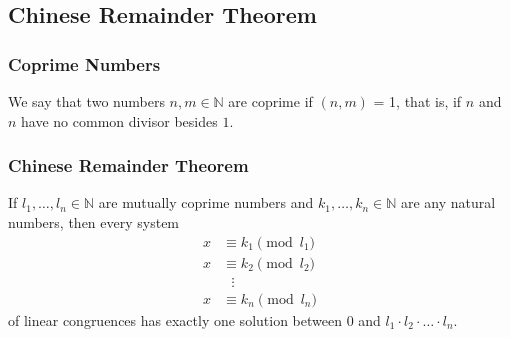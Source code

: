 \documentclass[aspectratio=169,11pt,usenames,dvipsnames]{beamer}
\newcommand{\N}{\mathbb{N}}
\begin{document}
\subsection{Chinese Remainder Theorem}

\begin{frame}
 \subsectionpage
\end{frame}

\begin{frame}
 \frametitle{Coprime Numbers}
 \begin{tcolorbox}[title=Coprime Numbers]
  We say that two numbers $n,m \in \N$ are \alert{coprime} if $(n,m)$ = 1, that
  is, if $n$ and $n$ have no common divisor besides $1$.
 \end{tcolorbox}
\end{frame}

\begin{frame}
 \frametitle{Chinese Remainder Theorem}
 \begin{tcolorbox}[title=Chinese Remainder Theorem]
  If $l_1,\ldots,l_n \in \N$ are \alert{mutually coprime} numbers and
  $k_1,\ldots,k_n \in \N$ are any natural numbers, then every
  system
  \begin{equation*}
   \begin{split}
    x & \equiv k_1 \pmod{l_1}\\
    x & \equiv k_2 \pmod{l_2}\\
      &~~~\vdots\\
    x & \equiv k_n \pmod{l_n}
   \end{split}
  \end{equation*}
  of linear congruences has \alert{exactly one solution} between $0$ and $l_1
  \cdot l_2 \cdot \ldots \cdot l_n$.
 \end{tcolorbox}
\end{frame}
\end{document}
